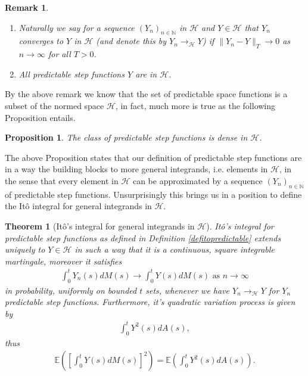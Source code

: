 \documentclass[11pt,a4paper, final]{article}
\newtheorem{thm}{Theorem}[section]
\newtheorem{prop}{Proposition}[section]
\newtheorem{rem}{Remark}[defn]
\begin{document}
\begin{rem} \ \begin{enumerate}
\item Naturally we say for a sequence $(Y_n)_{n \in \mathbb{N}}$ in $\mathcal{H}$ and $Y \in \mathcal{H}$ that $Y_n$ converges to $Y$ in $\mathcal{H}$ (and denote this by $Y_n \to_\mathcal{H} Y$) if $\| Y_n - Y \|_T \to 0$ as $n \to \infty$ for all $T >0$. 
\item All predictable step functions $Y$ are in $\mathcal{H}$.
\end{enumerate}
\end{rem}
\noindent By the above remark we know that the set of predictable space functions is a subset of the normed space $\mathcal{H}$, in fact, much more is true as the following Proposition entails.
\begin{prop}
The class of predictable step functions is dense in $\mathcal{H}$.
\end{prop}
\noindent The above Proposition states that our definition of predictable step functions are in a way the building blocks to more general integrands, i.e. elements in $\mathcal{H}$, in the sense that every element in $\mathcal{H}$ can be approximated by a sequence $(Y_n)_{n \in \mathbb{N}}$ of predictable step functions.  Unsurprisingly this brings us in a position to define the Itô integral for general integrands in $\mathcal{H}$. 
\begin{thm}[Itô's integral for general integrands in $\mathcal{H}$] Itô's integral for predictable step functions as defined in Definition \ref{defitopredictable} extends uniquely to $Y \in \mathcal{H}$ in such a way that it is a continuous, square integrable martingale, moreover it satisfies 
\begin{align*}
\int_0^t Y_n(s) dM(s) \to \int_0^t Y(s) dM(s) \text{ as } n \to \infty
\end{align*}
in probability, uniformly on bounded $t$ sets, whenever we have $Y_n \to_\mathcal{H} Y$ for $Y_n$ predictable step functions. Furthermore, it's quadratic variation process is given by 
\begin{align*}
\int_0^t Y^2(s) dA(s),
\end{align*}
thus 
\begin{align*}
\mathbb{E} \left( \left[ \int_0^t Y(s) dM(s) \right]^2 \right) = \mathbb{E} \left( \int_0^t Y^2(s) dA(s) \right). 
\end{align*}
\end{thm}
\newpage
\end{document}
